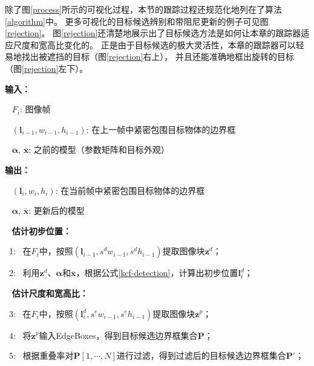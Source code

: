 除了图\ref{process}所示的可视化过程，本节的跟踪过程还规范化地列在了算法\ref{algorithm}中。
更多可视化的目标候选辨别和带阻尼更新的例子可见图\ref{rejection}。
图\ref{rejection}还清楚地展示出了目标候选方法是如何让本章的跟踪器适应尺度和宽高比变化的。
正是由于目标候选的极大灵活性，本章的跟踪器可以轻易地找出被遮挡的目标（图\ref{rejection}右上），
并且还能准确地框出旋转的目标（图\ref{rejection}左下）。

\begin{algorithm}[htb]
	\begin{flushleft}
		{{}\textbf{输入：}}{\small \par}
		{\quad{}}{{\ } $F_i$: 图像帧}{\small \par}
		{\quad{}}{{\ } $(\mathbf{l}_{i-1}, w_{i-1}, h_{i-1})$: 在上一帧中紧密包围目标物体的边界框}{\small \par}
		{\quad{}}{{\ } $\boldsymbol{\alpha}$, $\overline{\mathbf{x}}$: 之前的模型（参数矩阵和目标外观）}{\small \par}
		\vspace{0.1in}
		{{}\textbf{输出：}}{\small \par}
		{\quad{}}{{\ } $(\mathbf{l}_{i}, w_{i}, h_{i})$: 在当前帧中紧密包围目标物体的边界框}{\small \par}
		{\quad{}}{{\ } $\boldsymbol{\alpha}$, $\overline{\mathbf{x}}$: 更新后的模型}{\small \par}
		\vspace{0.1in}
		{\quad{}\ }{{} \textbf{估计初步位置：}}{\small \par}
		{{} \ 1: \ 在$F_i$中，按照$(\mathbf{l}_{i-1}, s^dw_{i-1}, s^dh_{i-1})$提取图像块$\mathbf{z}^d$；}{\small \par}
		{{} \ 2: \ 利用$\mathbf{z}^d$、$\boldsymbol{\alpha}$和$\overline{\mathbf{x}}$，根据公式\ref{kcf-detection}，计算出初步位置$\mathbf{l}^d_{i}$；}{\small \par}
		\vspace{0.1in}
		{\quad{}\ }{{} \textbf{估计尺度和宽高比：}}{\small \par}
		{{} \ 3: \ 在$F_i$中，按照$(\mathbf{l}^d_{i}, s^ew_{i-1}, s^eh_{i-1})$提取图像块$\mathbf{z}^p$；}{\small \par}
		{{} \ 4: \ 将$\mathbf{z}^p$输入EdgeBoxes，得到目标候选边界框集合$\mathbf{P}$；}{\small \par}
		{{} \ 5: \ 根据重叠率对$\mathbf{P}[1,\cdots,N]$进行过滤，得到过滤后的目标候选边界框集合$\mathbf{P}'$；}{\small \par}

\end{flushleft}
\end{algorithm}
